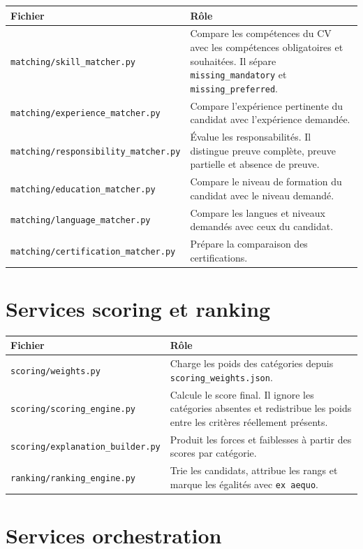\documentclass[12pt,a4paper]{report}
\begin{document}
\begin{longtable}{|p{5cm}|p{9cm}|}
\hline
\textbf{Fichier} & \textbf{Rôle} \\
\hline
\endhead
\texttt{matching/skill\_matcher.py} & Compare les compétences du CV avec les compétences obligatoires et souhaitées. Il sépare \texttt{missing\_mandatory} et \texttt{missing\_preferred}. \\
\hline
\texttt{matching/experience\_matcher.py} & Compare l'expérience pertinente du candidat avec l'expérience demandée. \\
\hline
\texttt{matching/responsibility\_matcher.py} & Évalue les responsabilités. Il distingue preuve complète, preuve partielle et absence de preuve. \\
\hline
\texttt{matching/education\_matcher.py} & Compare le niveau de formation du candidat avec le niveau demandé. \\
\hline
\texttt{matching/language\_matcher.py} & Compare les langues et niveaux demandés avec ceux du candidat. \\
\hline
\texttt{matching/certification\_matcher.py} & Prépare la comparaison des certifications. \\
\hline
\end{longtable}

\section{Services scoring et ranking}

\begin{longtable}{|p{5cm}|p{9cm}|}
\hline
\textbf{Fichier} & \textbf{Rôle} \\
\hline
\endhead
\texttt{scoring/weights.py} & Charge les poids des catégories depuis \texttt{scoring\_weights.json}. \\
\hline
\texttt{scoring/scoring\_engine.py} & Calcule le score final. Il ignore les catégories absentes et redistribue les poids entre les critères réellement présents. \\
\hline
\texttt{scoring/explanation\_builder.py} & Produit les forces et faiblesses à partir des scores par catégorie. \\
\hline
\texttt{ranking/ranking\_engine.py} & Trie les candidats, attribue les rangs et marque les égalités avec \texttt{ex aequo}. \\
\hline
\end{longtable}

\section{Services orchestration}
\end{document}
